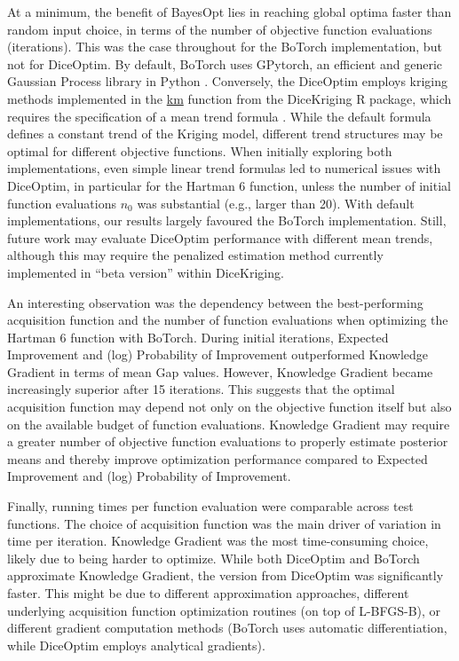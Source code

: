 At a minimum, the benefit of BayesOpt lies in reaching global optima faster than random input choice, in terms of the number of objective function evaluations (iterations). This was the case throughout for the BoTorch implementation, but not for DiceOptim. By default, BoTorch uses GPytorch, an efficient and generic Gaussian Process library in Python \cite{Gardner2018}. Conversely, the DiceOptim employs kriging methods implemented in the \href{https://rdrr.io/cran/DiceKriging/man/km.html}{km} function from the DiceKriging R package, which requires the specification of a mean trend formula \cite{Roustant2012}. While the default formula defines a constant trend of the Kriging model, different trend structures may be optimal for different objective functions. When initially exploring both implementations, even simple linear trend formulas led to numerical issues with DiceOptim, in particular for the Hartman 6 function, unless the number of initial function evaluations $n_0$ was substantial (e.g., larger than 20). With default implementations, our results largely favoured the BoTorch implementation. Still, future work may evaluate DiceOptim performance with different mean trends, although this may require the penalized estimation method currently implemented in ``beta version'' within DiceKriging.

An interesting observation was the dependency between the best-performing acquisition function and the number of function evaluations when optimizing the Hartman 6 function with BoTorch. During initial iterations, Expected Improvement and (log) Probability of Improvement outperformed Knowledge Gradient in terms of mean Gap values. However, Knowledge Gradient became increasingly superior after 15 iterations. This suggests that the optimal acquisition function may depend not only on the objective function itself but also on the available budget of function evaluations. Knowledge Gradient may require a greater number of objective function evaluations to properly estimate posterior means and thereby improve optimization performance compared to Expected Improvement and (log) Probability of Improvement.

Finally, running times per function evaluation were comparable across test functions. The choice of acquisition function was the main driver of variation in time per iteration. Knowledge Gradient was the most time-consuming choice, likely due to being harder to optimize. While both DiceOptim and BoTorch approximate Knowledge Gradient, the version from DiceOptim was significantly faster. This might be due to different approximation approaches, different underlying acquisition function optimization routines (on top of L-BFGS-B), or different gradient computation methods (BoTorch uses automatic differentiation, while DiceOptim employs analytical gradients).

